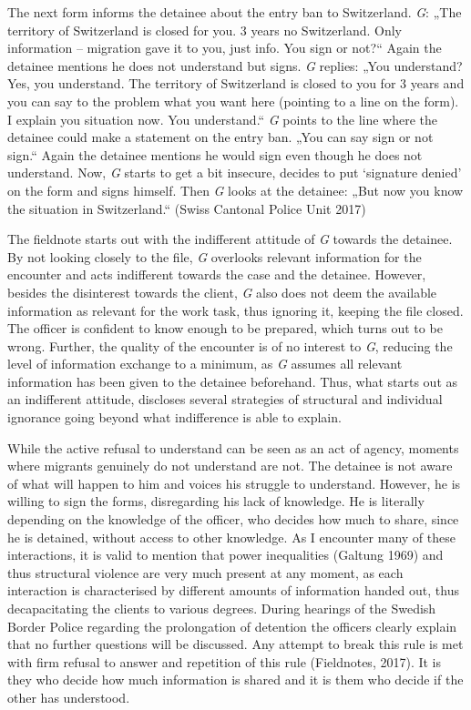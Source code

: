 {\noindent The next form informs the detainee about the entry ban to Switzerland. \emph{G}: „The territory of Switzerland is closed for you. 3 years no Switzerland. Only information – migration gave it to you, just info. You sign or not?“ Again the detainee mentions he does not understand but signs. \emph{G} replies: „You understand? Yes, you understand. The territory of Switzerland is closed to you for 3 years and you can say to the problem what you want here (pointing to a line on the form). I explain you situation now. You understand.“ \emph{G} points to the line where the detainee could make a statement on the entry ban. „You can say sign or not sign.“ Again the detainee mentions he would sign even though he does not understand. Now, \emph{G} starts to get a bit insecure, decides to put ‘signature denied’ on the form and signs himself. Then \emph{G} looks at the detainee: „But now you know the situation in Switzerland.“ (Swiss Cantonal Police Unit 2017)}
\par
The fieldnote starts out with the indifferent attitude of \emph{G} towards the detainee. By not looking closely to the file, \emph{G} overlooks relevant information for the encounter and acts indifferent towards the case and the detainee. However, besides the disinterest towards the client, \emph{G} also does not deem the available information as relevant for the work task, thus ignoring it, keeping the file closed. The officer is confident to know enough to be prepared, which turns out to be wrong. Further, the quality of the encounter is of no interest to \emph{G}, reducing the level of information exchange to a minimum, as \emph{G} assumes all relevant information has been given to the detainee beforehand. Thus, what starts out as an indifferent attitude, discloses several strategies of structural and individual ignorance going beyond what indifference is able to explain.
\par
While the active refusal to understand can be seen as an act of agency, moments where migrants genuinely do not understand are not. The detainee is not aware of what will happen to him and voices his struggle to understand. However, he is willing to sign the forms, disregarding his lack of knowledge. He is literally depending on the knowledge of the officer, who decides how much to share, since he is detained, without access to other knowledge. As I encounter many of these interactions, it is valid to mention that power inequalities (Galtung 1969) and thus structural violence are very much present at any moment, as each interaction is characterised by different amounts of information handed out, thus decapacitating the clients to various degrees. During hearings of the Swedish Border Police regarding the prolongation of detention the officers clearly explain that no further questions will be discussed. Any attempt to break this rule is met with firm refusal to answer and repetition of this rule (Fieldnotes, 2017). It is they who decide how much information is shared and it is them who decide if the other has understood.
